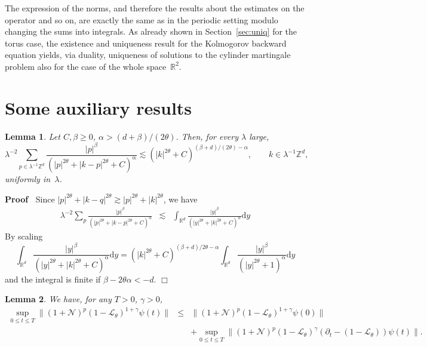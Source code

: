 \documentclass[10pt]{article}
\newcommand{\mathd}{\mathrm{d}}
\newenvironment{proof}{\noindent\textbf{Proof\ }}{\hspace*{\fill}$\Box$\medskip}
\newtheorem{lemma}{Lemma}
\begin{document}
The expression of the norms, and therefore the results about the estimates on
the operator and so on, are exactly the same as in the periodic setting modulo
changing the sums into integrals. As already shown in Section~\ref{sec:uniq}
for the torus case, the existence and uniqueness result for the Kolmogorov
backward equation yields, via duality, uniqueness of solutions to the cylinder
martingale problem also for the case of the whole space~$\mathbb{R}^2$.

\appendix\section{Some auxiliary results}\label{s:app-A}

\begin{lemma}
  \label{lem:app-estimate}Let $C, \beta \geqslant 0$, $\alpha > (d + \beta) /
  (2 \theta)$. Then, for every $\lambda$ large,
  \[ \lambda^{- 2} \sum_{p \in \lambda^{- 1} \mathbb{Z}^d} \frac{| p
     |^{\beta}}{(| p |^{2 \theta} + | k - p |^{2 \theta} + C)^{\alpha}}
     \lesssim (| k |^{2 \theta} + C)^{(\beta + d) / (2 \theta) - \alpha},
     \qquad k \in \lambda^{- 1} \mathbb{Z}^d, \]
  uniformly in~$\lambda$.
\end{lemma}

\begin{proof}
  Since $| p |^{2 \theta} + | k - q |^{2 \theta} \gtrsim | p |^{2 \theta} + |
  k |^{2 \theta}$, we have
  \[ \begin{array}{lll}
       \lambda^{- 2} \sum_p \frac{| p |^{\beta}}{(| p |^{2 \theta} + | k - p
       |^{2 \theta} + C)^{\alpha}} & \lesssim & \int_{\mathbb{R}^d} \frac{| y
       |^{\beta}}{(| y |^{2 \theta} + | k |^{2 \theta} + C)^{\alpha}} \mathd y
     \end{array} \]
  By scaling
  \[ \int_{\mathbb{R}^d} \frac{| y |^{\beta}}{(| y |^{2 \theta} + | k |^{2
     \theta} + C)^{\alpha}} \mathd y = (| k |^{2 \theta} + C)^{(\beta + d) / 2
     \theta - \alpha} \int_{\mathbb{R}^d} \frac{| y |^{\beta}}{(| y |^{2
     \theta} + 1)^{\alpha}} \mathd y \]
  and the integral is finite if $\beta - 2 \theta \alpha < - d$.
\end{proof}

\begin{lemma}
  \label{lemma:schauder}We have, for any $T > 0$, $\gamma > 0$,
  \begin{eqnarray*}
    \sup_{0 \leqslant t \leqslant T} \| (1 +\mathcal{N})^p (1
    -\mathcal{L}_{\theta})^{1 + \gamma} \psi (t) \| & \leqslant & \| (1
    +\mathcal{N})^p (1 -\mathcal{L}_{\theta})^{1 + \gamma} \psi (0) \|\\
    &  & + \sup_{0 \leqslant t \leqslant T} \| (1 +\mathcal{N})^p (1
    -\mathcal{L}_{\theta})^{\gamma} (\partial_t - (1 -\mathcal{L}_{\theta}))
    \psi (t) \| .
  \end{eqnarray*}
\end{lemma}
\end{document}
